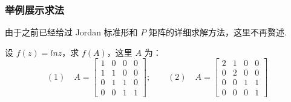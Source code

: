         \subsubsection{举例展示求法}
            \par 由于之前已经给过 Jordan 标准形和 $P$ 矩阵的详细求解方法，这里不再赘述.
            \begin{problem}
                \par 设 $f(z) = lnz$，求 $f(A)$，这里 $A$ 为：
                \begin{equation*}
                    (1) \quad A = \begin{bmatrix}
                        1 & 0 & 0 & 0 \\ 1 & 1 & 0 & 0 \\ 0 & 1 & 1 & 0 \\ 0 & 0 & 1  &1
                    \end{bmatrix}; \qquad (2) \quad A = \begin{bmatrix}
                        2 & 1 & 0 & 0 \\ 0 & 2 & 0 & 0 \\ 0 & 0 & 1 & 1 \\ 0 & 0 & 0 & 1
                    \end{bmatrix}
                \end{equation*}
            \end{problem}
